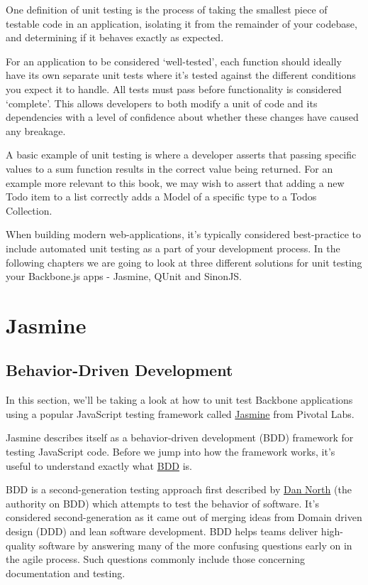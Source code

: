 \documentclass[9pt]{book}
\begin{document}
One definition of unit testing is the process of taking the smallest
piece of testable code in an application, isolating it from the
remainder of your codebase, and determining if it behaves exactly as
expected.

For an application to be considered `well-tested', each function should
ideally have its own separate unit tests where it's tested against the
different conditions you expect it to handle. All tests must pass before
functionality is considered `complete'. This allows developers to both
modify a unit of code and its dependencies with a level of confidence
about whether these changes have caused any breakage.

A basic example of unit testing is where a developer asserts that
passing specific values to a sum function results in the correct value
being returned. For an example more relevant to this book, we may wish
to assert that adding a new Todo item to a list correctly adds a Model
of a specific type to a Todos Collection.

When building modern web-applications, it's typically considered
best-practice to include automated unit testing as a part of your
development process. In the following chapters we are going to look at
three different solutions for unit testing your Backbone.js apps -
Jasmine, QUnit and SinonJS.

\section{Jasmine}\label{jasmine}

\subsection{Behavior-Driven
Development}\label{behavior-driven-development}

In this section, we'll be taking a look at how to unit test Backbone
applications using a popular JavaScript testing framework called
\href{http://pivotal.github.com/jasmine/}{Jasmine} from Pivotal Labs.

Jasmine describes itself as a behavior-driven development (BDD)
framework for testing JavaScript code. Before we jump into how the
framework works, it's useful to understand exactly what
\href{http://en.wikipedia.org/wiki/Behavior_Driven_Development}{BDD} is.

BDD is a second-generation testing approach first described by
\href{http://dannorth.net/introducing-bdd/}{Dan North} (the authority on
BDD) which attempts to test the behavior of software. It's considered
second-generation as it came out of merging ideas from Domain driven
design (DDD) and lean software development. BDD helps teams deliver
high-quality software by answering many of the more confusing questions
early on in the agile process. Such questions commonly include those
concerning documentation and testing.
\end{document}
